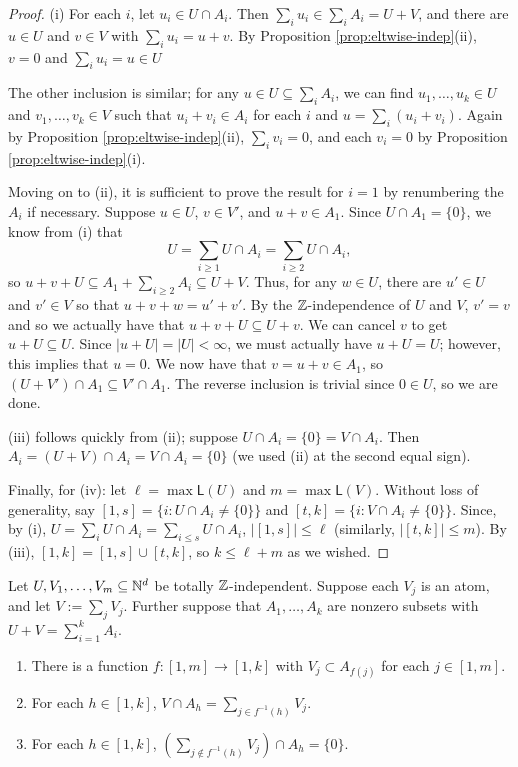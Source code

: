 \begin{proof}
(i) For each $i$, let $u_i\in U\cap A_i$.
Then $\sum_i u_i \in \sum_i A_i = U+V$, and there are $u\in U$ and $v\in V$ with $\sum_i u_i = u+v$.
By Proposition \ref{prop:eltwise-indep}(ii), $v = 0$ and $\sum_i u_i = u \in U$

The other inclusion is similar; for any $u\in U \subseteq \sum_i A_i$, we can find $u_1,\dots,u_k\in U$ and $v_1,\dots, v_k\in V$ such that $u_i+v_i\in A_i$ for each $i$ and $u = \sum_i (u_i + v_i)$.
Again by Proposition \ref{prop:eltwise-indep}(ii), $\sum_i v_i = 0$, and each $v_i = 0$ by Proposition \ref{prop:eltwise-indep}(i).

Moving on to (ii), it is sufficient to prove the result for $i=1$ by renumbering the $A_i$ if necessary.
Suppose $u\in U$, $v\in V'$, and $u+v\in A_1$.
Since $U\cap A_1 = \{0\}$, we know from (i) that
\[ U = \sum_{i\ge 1} U\cap A_i = \sum_{i\ge 2} U\cap A_i, \]
so $u+v + U \subseteq A_1 + \sum_{i\ge 2} A_i \subseteq U+V$.
Thus, for any $w\in U$, there are $u'\in U$ and $v'\in V$ so that $u+v+w = u'+v'$.
By the $\mathbb{Z}$-independence of $U$ and $V$, $v' = v$ and so we actually have that $u+v+U \subseteq U + v$.
We can cancel $v$ to get $u+U \subseteq U$.
Since $|u+U| = |U| <\infty$, we must actually have $u+U = U$; however, this implies that $u = 0$.
We now have that $v = u+v \in A_1$, so $(U+V')\cap A_1 \subseteq V' \cap A_1$.
The reverse inclusion is trivial since $0\in U$, so we are done.

(iii) follows quickly from (ii); suppose $U\cap A_i = \{0\} = V\cap A_i$.
Then $A_i = (U+V)\cap A_i = V\cap A_i = \{0\}$ (we used (ii) at the second equal sign).

Finally, for (iv): let $\ell = \max \mathsf{L}(U)$ and $m = \max\mathsf{L}(V)$.
Without loss of generality, say $[ 1,s ] = \{i: U\cap A_i \neq \{0\} \}$ and $[ t,k ] = \{i: V\cap A_i \neq \{0\} \}$.
Since, by (i), $U = \sum_i U\cap A_i = \sum_{i\le s} U \cap A_i$, $| [ 1,s ] | \le \ell$ (similarly, $|[ t,k ]| \le m$).
By (iii), $[ 1,k ] = [ 1,s ] \cup [ t,k ]$, so $k \le \ell + m$ as we wished.
\end{proof}

\begin{lemma} \label{lem:indep-atom-decomp}
Let $U, V_1,\dots, V_m\subseteq \mathbb{N}^d$ be totally $\mathbb{Z}$-independent.
Suppose each $V_j$ is an atom, and let $V := \sum_j V_j$.
Further suppose that $A_1,\dots, A_k$ are nonzero subsets with $U+V = \sum_{i=1}^k A_i$.
\begin{enumerate}[label={\rm (\roman{*})}]
	\item There is a function $f: [ 1,m ] \to [ 1,k ]$ with $V_j \subset A_{f(j)}$ for each $j\in [ 1,m]$.
	\item For each $h\in [ 1,k]$, $V\cap A_h = \sum\limits_{j\in f^{-1}(h)} V_j$.
	\item For each $h\in [ 1,k]$, $\left( \sum\limits_{j\notin f^{-1}(h)} V_j \right) \cap A_h = \{0\}$.
\end{enumerate}
\end{lemma}

